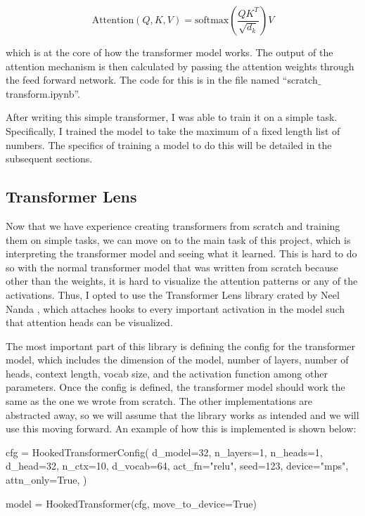 \documentclass{article}
\begin{document}
$$
\text{Attention}(Q, K, V) = \text{softmax}\left(\frac{QK^T}{\sqrt{d_k}}\right)V
$$

which is at the core of how the transformer model works. The output of the attention mechanism is then calculated by passing the attention weights through the feed forward network. The code for this is in the file named ``scratch$\_$transform.ipynb''.

After writing this simple transformer, I was able to train it on a simple task. Specifically, I trained the model to take the maximum of a fixed length list of numbers. The specifics of training a model to do this will be detailed in the subsequent sections.

\subsection{Transformer Lens}

Now that we have experience creating transformers from scratch and training them on simple tasks, we can move on to the main task of this project, which is interpreting the transformer model and seeing what it learned. This is hard to do so with the normal transformer model that was written from scratch because other than the weights, it is hard to visualize the attention patterns or any of the activations. Thus, I opted to use the Transformer Lens library crated by Neel Nanda \cite{9}, which attaches hooks to every important activation in the model such that attention heads can be visualized. 

The most important part of this library is defining the config for the transformer model, which includes the dimension of the model, number of layers, number of heads, context length, vocab size, and the activation function among other parameters. Once the config is defined, the transformer model should work the same as the one we wrote from scratch. The other implementations are abstracted away, so we will assume that the library works as intended and we will use this moving forward. An example of how this is implemented is shown below:

\begin{python}
cfg = HookedTransformerConfig(
    d_model=32,
    n_layers=1,
    n_heads=1,
    d_head=32,
    n_ctx=10,
    d_vocab=64,
    act_fn="relu",
    seed=123,
    device="mps",
    attn_only=True,
)

model = HookedTransformer(cfg, move_to_device=True)
\end{python}
\end{document}
